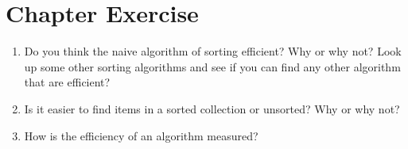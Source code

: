 \documentclass[../main.tex]{subfiles}
\begin{document}
    \section{Chapter Exercise}
    \begin{enumerate}
        \item Do you think the naive algorithm of sorting efficient? Why or why
        not? Look up some other sorting algorithms and see if you can find
        any other algorithm that are efficient?
        \item Is it easier to find items in a sorted collection or unsorted? Why
        or why not?
        \item How is the efficiency of an algorithm measured?
    \end{enumerate}
\end{document}
